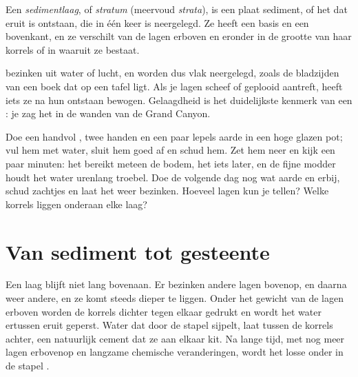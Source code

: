 \begin{definition}[Sedimentlaag]\label{def:g7:sediments-and-fossils:layer}
Een \emph{sedimentlaag}, of
\emph{stratum} (meervoud \emph{strata}), is een plaat
sediment, of het  dat eruit is ontstaan, die in één keer is
neergelegd. Ze heeft een basis en een bovenkant, en ze verschilt van de
lagen erboven en eronder in de grootte van haar korrels of in waaruit ze
bestaat.
\end{definition}

 bezinken uit water of lucht, en worden dus vlak neergelegd,
zoals de bladzijden van een boek dat op een tafel ligt. Als je lagen
scheef of geplooid aantreft, heeft iets ze na hun ontstaan bewogen.
Gelaagdheid is het duidelijkste kenmerk van een : je
zag het in de wanden van de Grand Canyon.

\begin{inthelab}
Doe een handvol , twee handen  en een paar lepels aarde in een
hoge glazen pot; vul hem met water, sluit hem goed af en schud hem. Zet hem
neer en kijk een paar minuten: het  bereikt meteen de bodem, het 
iets later, en de fijne modder houdt het water urenlang troebel. Doe de
volgende dag nog wat aarde en  erbij, schud zachtjes en laat het weer
bezinken. Hoeveel lagen kun je tellen? Welke korrels liggen onderaan elke
laag?
\end{inthelab}

\section{Van sediment tot gesteente}

Een laag blijft niet lang bovenaan. Er bezinken andere lagen bovenop, en
daarna weer andere, en ze komt steeds dieper te liggen. Onder het gewicht
van de lagen erboven worden de korrels dichter tegen elkaar gedrukt en
wordt het water ertussen eruit geperst. Water dat door de stapel sijpelt,
laat tussen de korrels  achter, een natuurlijk cement dat ze aan
elkaar kit. Na lange tijd, met nog meer lagen erbovenop en langzame
chemische veranderingen, wordt het losse  onder in de stapel
.

